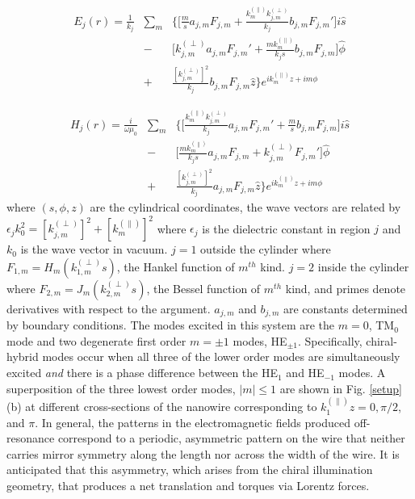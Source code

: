\begin{eqnarray}\label{Efield}
E_j(r) = \frac{1}{k_j}& \sum_m&\Big\{\big[\frac{m}{s}a_{j,m}F_{j,m}+\frac{k^{(\parallel)}_{m}k^{(\perp)}_{j ,m}}{k_j}b_{j,m}F_{j,m}'\big]i\hat{s}\nonumber \\
  &-&\big[{k_{j ,m}^{(\perp)}}a_{j,m}F_{j,m}'+\frac{mk^{(\parallel)}_{m}}{k_js}b_{j,m}F_{j,m}\big]\hat{\phi} \\
  &+& \frac{[k^{(\perp)}_{j ,m}]^2}{k_j}b_{j,m}F_{j,m}\hat{z}\Big\}e^{ik^{(\parallel)}_{m}z+im\phi} \nonumber
\end{eqnarray}



\begin{eqnarray}\label{Hfield}
H_j(r) = \frac{i}{\omega\mu_0}&\sum_m &\Big\{\big[\frac{k^{(\parallel)}_{m}k_{j ,m}^{(\perp)}}{k_j}a_{j,m}F_{j,m}'+\frac{m}{s}b_{j,m}F_{j,m}\big]i\hat{s}\nonumber \\
&-&\big[\frac{mk^{(\parallel)}_{m}}{k_js}a_{j,m}F_{j,m}+{k_{j ,m}^{(\perp)}}F_{j,m}'\big]\hat{\phi}\\
&+&\frac{[k_{j ,m}^{(\perp)}]^2}{k_j}a_{j,m}F_{j,m}\hat{z}\Big\}e^{ik^{(\parallel)}_{m}z+im\phi}\nonumber
\end{eqnarray}
where $(s,\phi,z)$ are the cylindrical coordinates, the wave vectors are related by $\epsilon_jk_0^2=[k_{j ,m}^{(\perp)}]^2+[k^{(\parallel)}_m]^2$ where $\epsilon_j$ is the dielectric constant in region $j$ and $k_0$ is the wave vector in vacuum. $j=1$ outside the cylinder where $F_{1,m} = H_m (k_{1,m}^{(\perp)} s)$, the Hankel function of $m^{th}$ kind. $j=2$ inside the cylinder where $F_{2,m} = J_m(k_{2,m}^{(\perp)} s)$, the Bessel function of $m^{th}$ kind, and primes denote derivatives with respect to the argument. $a_{j,m}$ and $b_{j,m}$ are constants determined by boundary conditions. The modes excited in this system are the $m=0$, TM$_0$ mode and two degenerate first order $m=\pm 1$ modes, HE$_{\pm 1}$. Specifically, chiral-hybrid modes occur when all three of the lower order modes are simultaneously excited \textit{and} there is a phase difference between the HE$_1$ and HE$_{-1}$ modes.
A superposition of the three lowest order modes, $|m|\leq 1$ are shown in Fig. \ref{setup}(b) at different cross-sections of the nanowire corresponding to $k^{(\parallel)}_1z = 0, \pi/2$, and $\pi$. In general, the patterns in the electromagnetic fields produced off-resonance correspond to a periodic, asymmetric pattern on the wire that neither carries mirror symmetry along the length nor across the width of the wire.  It is anticipated that this asymmetry, which arises from the chiral illumination geometry, that produces a net translation and torques via Lorentz forces.

